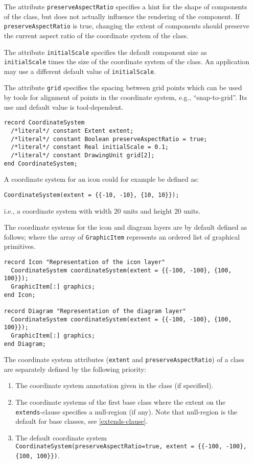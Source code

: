 The attribute \lstinline!preserveAspectRatio! specifies a hint for the shape of components of the class, but does not actually influence the rendering of the component.
If \lstinline!preserveAspectRatio! is true, changing the extent of components should preserve the current aspect ratio of the coordinate system of the class.

The attribute \lstinline!initialScale! specifies the default component size as \lstinline!initialScale! times the size of the coordinate system of the class.
An application may use a different default value of \lstinline!initialScale!.

The attribute \lstinline!grid! specifies the spacing between grid points which can be used by tools for alignment of points in the coordinate system, e.g., ``snap-to-grid''.
Its use and default value is tool-dependent.

\begin{lstlisting}[language=modelica]
record CoordinateSystem
  /*literal*/ constant Extent extent;
  /*literal*/ constant Boolean preserveAspectRatio = true;
  /*literal*/ constant Real initialScale = 0.1;
  /*literal*/ constant DrawingUnit grid[2];
end CoordinateSystem;
\end{lstlisting}

\begin{example}
A coordinate system for an icon could for example be defined as:
\begin{lstlisting}[language=modelica]
CoordinateSystem(extent = {{-10, -10}, {10, 10}});
\end{lstlisting}
i.e., a coordinate system with width 20 units and height 20 units.
\end{example}

The coordinate systems for the icon and diagram layers are by default defined as follows; where the array of \lstinline!GraphicItem! represents an ordered list of graphical primitives.

\begin{lstlisting}[language=modelica]
record Icon "Representation of the icon layer"
  CoordinateSystem coordinateSystem(extent = {{-100, -100}, {100, 100}});
  GraphicItem[:] graphics;
end Icon;

record Diagram "Representation of the diagram layer"
  CoordinateSystem coordinateSystem(extent = {{-100, -100}, {100, 100}});
  GraphicItem[:] graphics;
end Diagram;
\end{lstlisting}
The coordinate system attributes (\lstinline!extent! and \lstinline!preserveAspectRatio!) of a class are separately defined by the following priority:
\begin{enumerate}
\item
  The coordinate system annotation given in the class (if specified).
\item
  The coordinate systems of the first base class where the extent on the \lstinline!extends!-clause specifies a null-region (if any).
  Note that null-region is the default for base classes, see \cref{extends-clause}.
\item
  The default coordinate system \lstinline!CoordinateSystem(preserveAspectRatio=true, extent = {{-100, -100}, {100, 100}})!.
\end{enumerate}

